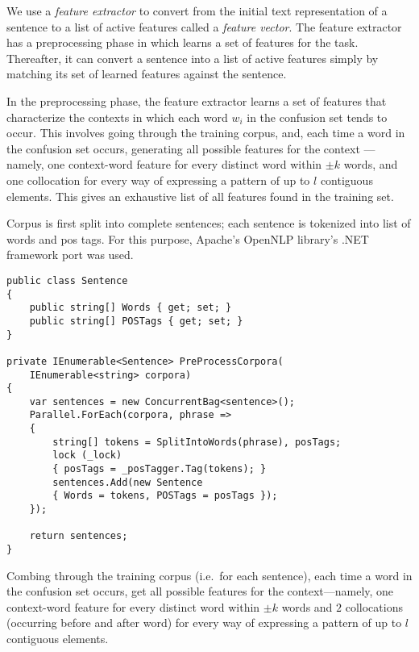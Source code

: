 
We use a \textit{feature extractor} to convert from the initial text
representation of a sentence to a list of active features called a
\textit{feature vector}. The feature extractor has a preprocessing phase in
which learns a set of features for the task. Thereafter, it can convert a
sentence into a list of active features simply by matching its set of learned
features against the sentence.

In the preprocessing phase, the feature extractor learns a set of features that
characterize the contexts in which each word \(w_i\) in the confusion set tends
to occur. This involves going through the training corpus, and, each time a
word in the confusion set occurs, generating all possible features for the
context --- namely, one context-word feature for every distinct word within
\(\pm k\) words, and one collocation for every way of expressing a pattern of
up to \(l\) contiguous elements. This gives an exhaustive list of all features
found in the training set.


Corpus is first split into complete sentences; each sentence is tokenized into
list of words and pos tags. For this purpose, Apache's OpenNLP library's .NET
framework port was used.

\lstset{style=sharpc}
\begin{lstlisting}
public class Sentence
{
    public string[] Words { get; set; }
    public string[] POSTags { get; set; }
}

private IEnumerable<Sentence> PreProcessCorpora(
    IEnumerable<string> corpora)
{
    var sentences = new ConcurrentBag<sentence>();
    Parallel.ForEach(corpora, phrase =>
    {
        string[] tokens = SplitIntoWords(phrase), posTags;
        lock (_lock)
        { posTags = _posTagger.Tag(tokens); }
        sentences.Add(new Sentence
        { Words = tokens, POSTags = posTags });
    });

    return sentences;
}
\end{lstlisting}


Combing through the training corpus (i.e.\ for each sentence), each time a word
in the confusion set occurs, get all possible features for the
context---namely, one context-word feature for every distinct word within \(\pm
k\) words and \(2\) collocations (occurring before and after word) for every
way of expressing a pattern of up to \(l\) contiguous elements.

